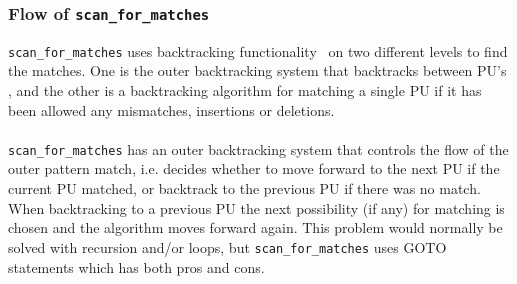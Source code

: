 \documentclass[12pt]{article}
\newcommand{\scm}{\texttt{scan\_for\_matches} }
\newcommand{\pu}{PU }
\newcommand{\pus}{PU's }
\begin{document}
\subsubsection{Flow of \scm}
\scm uses backtracking functionality~\cite{back} on two different levels to find the matches. 
One is the outer backtracking system that backtracks between \pus, and the other is a backtracking algorithm
for matching a single \pu if it has been allowed any mismatches, insertions or deletions. \\ \\
\scm has an outer backtracking system that controls the flow of the outer pattern match, i.e. decides whether to
move forward to the next \pu if the current \pu matched, or backtrack to the previous \pu if there was no match.
When backtracking to a previous \pu the next possibility (if any) for matching is chosen and the algorithm moves
forward again. This problem would normally be solved with recursion and/or loops, but \scm uses GOTO statements which has 
both pros and cons. \\
\end{document}
